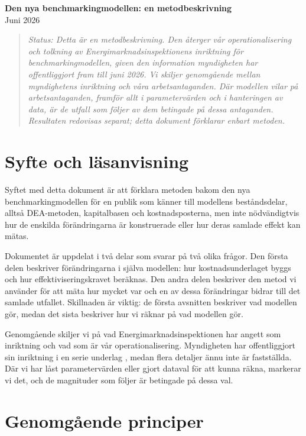 \documentclass[11pt,a4paper]{article}
\begin{document}
\begin{center}
  {\LARGE\bfseries Den nya benchmarkingmodellen: en metodbeskrivning}\\[4pt]
  {\normalsize Juni 2026}
\end{center}

\begin{quote}\itshape\small
Status: Detta är en metodbeskrivning. Den återger vår operationalisering och tolkning av
Energimarknadsinspektionens inriktning för benchmarkingmodellen, given den information
myndigheten har offentliggjort fram till juni 2026. Vi skiljer genomgående mellan myndighetens
inriktning och våra arbetsantaganden. Där modellen vilar på arbetsantaganden, framför allt i
parametervärden och i hanteringen av data, är de utfall som följer av dem betingade på dessa
antaganden. Resultaten redovisas separat; detta dokument förklarar enbart metoden.
\end{quote}

\section{Syfte och läsanvisning}

Syftet med detta dokument är att förklara metoden bakom den nya benchmarkingmodellen för en
publik som känner till modellens beståndsdelar, alltså DEA-metoden, kapitalbasen och
kostnadsposterna, men inte nödvändigtvis hur de enskilda förändringarna är konstruerade eller
hur deras samlade effekt kan mätas.

Dokumentet är uppdelat i två delar som svarar på två olika frågor. Den första delen beskriver
förändringarna i själva modellen: hur kostnadsunderlaget byggs och hur effektiviseringskravet
beräknas. Den andra delen beskriver den metod vi använder för att mäta hur mycket var och en av
dessa förändringar bidrar till det samlade utfallet. Skillnaden är viktig: de första avsnitten
beskriver vad modellen gör, medan det sista beskriver hur vi räknar på vad modellen gör.

Genomgående skiljer vi på vad Energimarknadsinspektionen har angett som inriktning och vad som
är vår operationalisering. Myndigheten har offentliggjort sin inriktning i en serie underlag \citep{Ei2025Inriktning, Ei2025Benchmarking, Ei2025Tillampning, Ei2026Effektivisering}, medan flera detaljer
ännu inte är fastställda. Där vi har låst parametervärden eller gjort dataval för att kunna
räkna, markerar vi det, och de magnituder som följer är betingade på dessa val.

\section{Genomgående principer}
\end{document}
